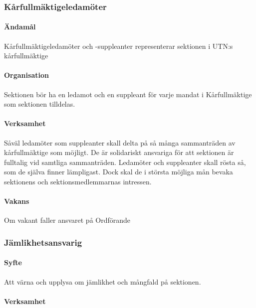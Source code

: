 \documentclass{../resources/dgovdoc}
\begin{document}
\subsubsection{Kårfullmäktigeledamöter}

\paragraph{Ändamål}

Kårfullmäktigeledamöter och -suppleanter representerar sektionen i UTN:s kårfullmäktige

\paragraph{Organisation}

Sektionen bör ha en ledamot och en suppleant för varje mandat i Kårfullmäktige som sektionen tilldelas.

\paragraph{Verksamhet}

Såväl ledamöter som suppleanter skall delta på så många sammanträden av kårfullmäktige som möjligt.
De är solidariskt ansvariga för att sektionen är fulltalig vid samtliga sammanträden. 
Ledamöter och suppleanter skall rösta så, som de själva finner lämpligast. Dock skal de i största möjliga mån
bevaka sektionens och sektionsmedlemmarnas intressen. 

\paragraph{Vakans}

Om vakant faller ansvaret på Ordförande

\subsubsection{Jämlikhetsansvarig}

\paragraph{Syfte}

Att värna och upplysa om jämlikhet och mångfald på sektionen.

\paragraph{Verksamhet}
\end{document}
